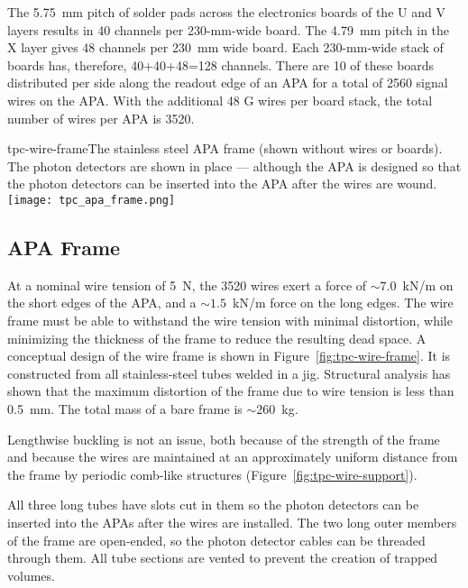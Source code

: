 The 5.75~mm pitch of solder pads across the electronics boards of the U and V layers results in 40 channels per 230-mm-wide board.  The 4.79~mm pitch in the X layer gives 48 channels per 230~mm wide board.  Each 230-mm-wide stack of boards has, therefore, 40+40+48=128 channels.  There are 10 of these boards distributed per side along the readout edge of an APA for a total of 2560 signal wires on the APA.  With the additional 48 G wires per board stack, the total number of wires per APA is 3520.

\begin{cdrfigure}{tpc-wire-frame}{The stainless steel APA frame (shown without wires or boards). The photon detectors are shown in place --- although the APA is designed so that the photon detectors can be inserted into the APA after the wires are wound.}
\texttt{[image: tpc\_apa\_frame.png]}
\end{cdrfigure}


\subsection{APA Frame}

At a nominal wire tension of 5~N, the 3520 wires exert a force of 
$\sim7.0$~kN/m on the short edges of the APA, and a 
$\sim1.5$~kN/m force on the long edges. The wire 
frame must be able to withstand the wire tension with  minimal 
distortion, while minimizing the thickness of the 
frame to reduce the resulting dead space. A conceptual design 
of the wire frame is shown in Figure~\ref{fig:tpc-wire-frame}.  
It is constructed from all stainless-steel tubes welded in a jig.  
Structural analysis has shown that the maximum distortion of the frame due to wire tension is less than 0.5~mm. The total mass of a bare frame is $\sim$260~kg.

Lengthwise buckling is not an issue, both because of the strength of the frame and because the wires are maintained at an approximately uniform distance from the frame by periodic comb-like structures (Figure~\ref{fig:tpc-wire-support}).

All three long tubes have slots cut in them so the photon detectors can be inserted into the APAs after the wires are installed.  The two long outer members of the frame are open-ended, so the photon detector cables can be threaded through them.  All tube sections are vented to prevent the creation of trapped volumes.



